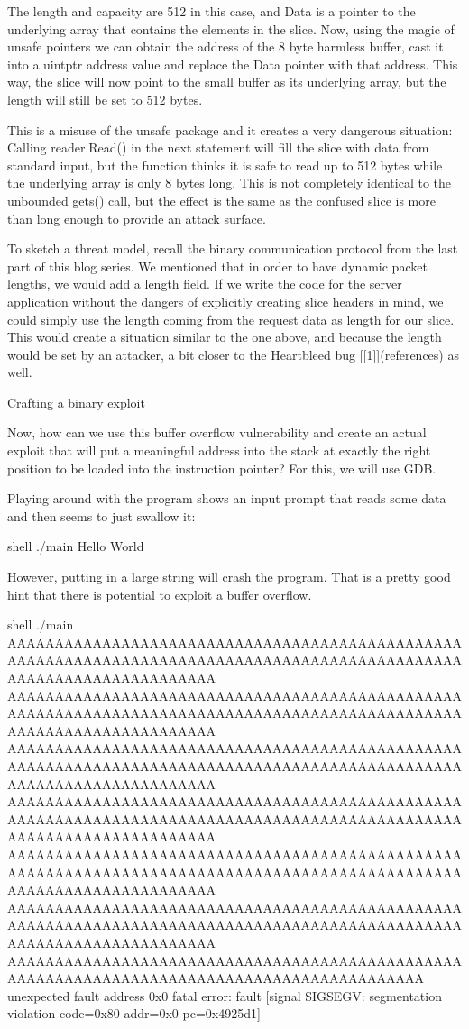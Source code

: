 The length and capacity are 512 in this case, and Data is a pointer to the underlying array that contains the elements
in the slice. Now, using the magic of unsafe pointers we can obtain the address of the 8 byte harmless buffer, cast it
into a uintptr address value and replace the Data pointer with that address. This way, the slice will now point to the
small buffer as its underlying array, but the length will still be set to 512 bytes.

This is a misuse of the unsafe package and it creates a very dangerous situation: Calling reader.Read() in the next
statement will fill the slice with data from standard input, but the function thinks it is safe to read up to 512 bytes
while the underlying array is only 8 bytes long. This is not completely identical to the unbounded gets() call,
but the effect is the same as the confused slice is more than long enough to provide an attack surface.

To sketch a threat model, recall the binary communication protocol from the last part of this blog series. We mentioned
that in order to have dynamic packet lengths, we would add a length field. If we write the code for the server application
without the dangers of explicitly creating slice headers in mind, we could simply use the length coming from the request
data as length for our slice. This would create a situation similar to the one above, and because the length would be
set by an attacker, a bit closer to the Heartbleed bug [[1]](references) as well.


 Crafting a binary exploit

Now, how can we use this buffer overflow vulnerability and create an actual exploit that will put a meaningful address
into the stack at exactly the right position to be loaded into the instruction pointer? For this, we will use GDB.

Playing around with the program shows an input prompt that reads some data and then seems to just swallow it:

shell
 ./main
Hello World



However, putting in a large string will crash the program. That is a pretty good hint that there is potential to
exploit a buffer overflow.

shell
 ./main
AAAAAAAAAAAAAAAAAAAAAAAAAAAAAAAAAAAAAAAAAAAAAAAAAAAAAAAAAAAAAAAAAAAAAAAAAAAAAAAAAAAAAAAAAAAAAAAAAAAAAAAAAAAAAAAAAAAAAA
AAAAAAAAAAAAAAAAAAAAAAAAAAAAAAAAAAAAAAAAAAAAAAAAAAAAAAAAAAAAAAAAAAAAAAAAAAAAAAAAAAAAAAAAAAAAAAAAAAAAAAAAAAAAAAAAAAAAAA
AAAAAAAAAAAAAAAAAAAAAAAAAAAAAAAAAAAAAAAAAAAAAAAAAAAAAAAAAAAAAAAAAAAAAAAAAAAAAAAAAAAAAAAAAAAAAAAAAAAAAAAAAAAAAAAAAAAAAA
AAAAAAAAAAAAAAAAAAAAAAAAAAAAAAAAAAAAAAAAAAAAAAAAAAAAAAAAAAAAAAAAAAAAAAAAAAAAAAAAAAAAAAAAAAAAAAAAAAAAAAAAAAAAAAAAAAAAAA
AAAAAAAAAAAAAAAAAAAAAAAAAAAAAAAAAAAAAAAAAAAAAAAAAAAAAAAAAAAAAAAAAAAAAAAAAAAAAAAAAAAAAAAAAAAAAAAAAAAAAAAAAAAAAAAAAAAAAA
AAAAAAAAAAAAAAAAAAAAAAAAAAAAAAAAAAAAAAAAAAAAAAAAAAAAAAAAAAAAAAAAAAAAAAAAAAAAAAAAAAAAAAAAAAAAAAAAAAAAAAAAAAAAAAAAAAAAAA
AAAAAAAAAAAAAAAAAAAAAAAAAAAAAAAAAAAAAAAAAAAAAAAAAAAAAAAAAAAAAAAAAAAAAAAAAAAAAAAAAAAAAAAAAAAA
unexpected fault address 0x0
fatal error: fault
[signal SIGSEGV: segmentation violation code=0x80 addr=0x0 pc=0x4925d1]

